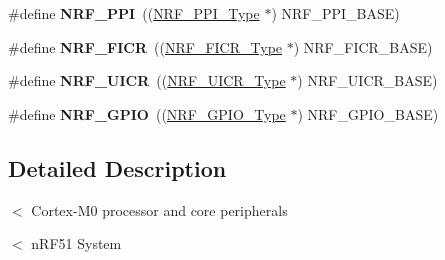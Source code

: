 \begin{DoxyCompactItemize}
\item 
\hypertarget{group___device___peripheral___registers_ga2bb7f617c19a35fd7e41a312104d07b0}{}\#define {\bfseries N\+R\+F\+\_\+\+P\+P\+I}~((\hyperlink{struct_n_r_f___p_p_i___type}{N\+R\+F\+\_\+\+P\+P\+I\+\_\+\+Type}            $\ast$) N\+R\+F\+\_\+\+P\+P\+I\+\_\+\+B\+A\+S\+E)\label{group___device___peripheral___registers_ga2bb7f617c19a35fd7e41a312104d07b0}

\item 
\hypertarget{group___device___peripheral___registers_gaf5b17d772ce3562100afd5460a22c615}{}\#define {\bfseries N\+R\+F\+\_\+\+F\+I\+C\+R}~((\hyperlink{struct_n_r_f___f_i_c_r___type}{N\+R\+F\+\_\+\+F\+I\+C\+R\+\_\+\+Type}           $\ast$) N\+R\+F\+\_\+\+F\+I\+C\+R\+\_\+\+B\+A\+S\+E)\label{group___device___peripheral___registers_gaf5b17d772ce3562100afd5460a22c615}

\item 
\hypertarget{group___device___peripheral___registers_gad3c3b136224cc24ca5e48cfa7a71eda3}{}\#define {\bfseries N\+R\+F\+\_\+\+U\+I\+C\+R}~((\hyperlink{struct_n_r_f___u_i_c_r___type}{N\+R\+F\+\_\+\+U\+I\+C\+R\+\_\+\+Type}           $\ast$) N\+R\+F\+\_\+\+U\+I\+C\+R\+\_\+\+B\+A\+S\+E)\label{group___device___peripheral___registers_gad3c3b136224cc24ca5e48cfa7a71eda3}

\item 
\hypertarget{group___device___peripheral___registers_gacd047b2c36b6dc9d5810536db8f347b1}{}\#define {\bfseries N\+R\+F\+\_\+\+G\+P\+I\+O}~((\hyperlink{struct_n_r_f___g_p_i_o___type}{N\+R\+F\+\_\+\+G\+P\+I\+O\+\_\+\+Type}           $\ast$) N\+R\+F\+\_\+\+G\+P\+I\+O\+\_\+\+B\+A\+S\+E)\label{group___device___peripheral___registers_gacd047b2c36b6dc9d5810536db8f347b1}

\end{DoxyCompactItemize}


\subsection{Detailed Description}
$<$ Cortex-\/\+M0 processor and core peripherals

$<$ n\+R\+F51 System 